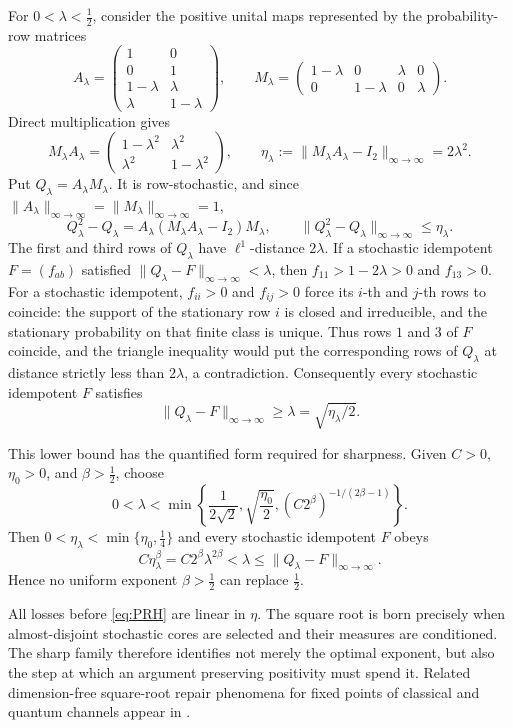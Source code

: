 \documentclass[10pt]{article}
\newcommand{\norm}[1]{\lVert #1\rVert}
\begin{document}
For $0<\lambda<\tfrac12$, consider the positive unital maps represented by
the probability-row matrices
\[
A_\lambda=
\begin{pmatrix}
1&0\\ 0&1\\ 1-\lambda&\lambda\\ \lambda&1-\lambda
\end{pmatrix},
\qquad
M_\lambda=
\begin{pmatrix}
1-\lambda&0&\lambda&0\\ 0&1-\lambda&0&\lambda
\end{pmatrix}.
\]
Direct multiplication gives
\[
M_\lambda A_\lambda=
\begin{pmatrix}1-\lambda^2&\lambda^2\\
\lambda^2&1-\lambda^2\end{pmatrix},
\qquad
\eta_\lambda:=
\norm{M_\lambda A_\lambda-I_2}_{\infty\to\infty}=2\lambda^2.
\]
Put $Q_\lambda=A_\lambda M_\lambda$.  It is row-stochastic, and since
$\norm{A_\lambda}_{\infty\to\infty}=
\norm{M_\lambda}_{\infty\to\infty}=1$,
\[
Q_\lambda^2-Q_\lambda
=A_\lambda(M_\lambda A_\lambda-I_2)M_\lambda,
\qquad
\norm{Q_\lambda^2-Q_\lambda}_{\infty\to\infty}\leq\eta_\lambda.
\]
The first and third rows of $Q_\lambda$ have $\ell^1$-distance $2\lambda$.
If a stochastic idempotent $F=(f_{ab})$ satisfied
$\norm{Q_\lambda-F}_{\infty\to\infty}<\lambda$, then
$f_{11}>1-2\lambda>0$ and $f_{13}>0$.  For a stochastic idempotent,
$f_{ii}>0$ and $f_{ij}>0$ force its $i$-th and $j$-th rows to coincide:
the support of the stationary row $i$ is closed and irreducible, and the
stationary probability on that finite class is unique.  Thus rows $1$ and
$3$ of $F$ coincide, and the triangle inequality would put the corresponding
rows of $Q_\lambda$ at distance strictly less than $2\lambda$, a
contradiction.  Consequently every stochastic idempotent $F$ satisfies
\[
\norm{Q_\lambda-F}_{\infty\to\infty}
\geq\lambda=\sqrt{\eta_\lambda/2}.
\]

This lower bound has the quantified form required for sharpness.  Given
$C>0$, $\eta_0>0$, and $\beta>\tfrac12$, choose
\[
0<\lambda<\min\left\{\frac1{2\sqrt2},
\sqrt{\frac{\eta_0}{2}},(C2^\beta)^{-1/(2\beta-1)}\right\}.
\]
Then $0<\eta_\lambda<\min\{\eta_0,\tfrac14\}$ and every stochastic
idempotent $F$ obeys
\[
C\eta_\lambda^\beta
=C2^\beta\lambda^{2\beta}
<\lambda
\leq\norm{Q_\lambda-F}_{\infty\to\infty}.
\]
Hence no uniform exponent $\beta>\tfrac12$ can replace $\tfrac12$.

All losses before \eqref{eq:PRH} are linear in $\eta$.  The square root is
born precisely when almost-disjoint stochastic cores are selected and their
measures are conditioned.  The sharp family therefore identifies not merely
the optimal exponent, but also the step at which an argument preserving
positivity must spend it.  Related dimension-free square-root repair
phenomena for fixed points of classical and quantum channels appear in
\cite{SalzmannBerghDatta}.
\end{document}
